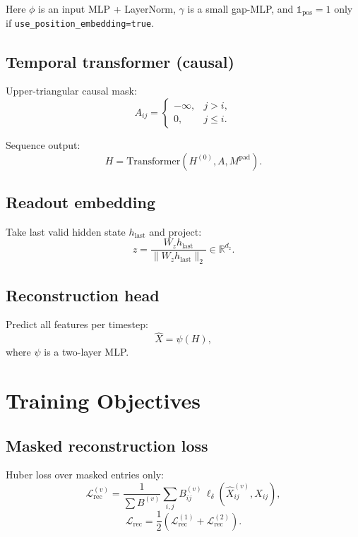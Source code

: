 \documentclass[11pt]{article}
\begin{document}
Here $\phi$ is an input MLP + LayerNorm, $\gamma$ is a small gap-MLP, and $\mathbb{1}_{\text{pos}}=1$ only if \texttt{use\_position\_embedding=true}.

\subsection{Temporal transformer (causal)}
Upper-triangular causal mask:
\begin{equation}
A_{ij}=
\begin{cases}
-\infty,&j>i,\\
0,&j\le i.
\end{cases}
\end{equation}

Sequence output:
\begin{equation}
 H = \text{Transformer}(H^{(0)}, A, M^{\text{pad}}).
\end{equation}

\subsection{Readout embedding}
Take last valid hidden state $h_{\text{last}}$ and project:
\begin{equation}
 z = \frac{W_z h_{\text{last}}}{\|W_z h_{\text{last}}\|_2} \in \mathbb{R}^{d_z}.
\end{equation}

\subsection{Reconstruction head}
Predict all features per timestep:
\begin{equation}
 \hat X = \psi(H),
\end{equation}
where $\psi$ is a two-layer MLP.

\section{Training Objectives}

\subsection{Masked reconstruction loss}
Huber loss over masked entries only:
\begin{equation}
\mathcal{L}_{\text{rec}}^{(v)}=
\frac{1}{\sum B^{(v)}}
\sum_{i,j} B_{ij}^{(v)}\,\ell_\delta\!\left(\hat X_{ij}^{(v)},X_{ij}\right),
\end{equation}
\begin{equation}
\mathcal{L}_{\text{rec}} = \frac{1}{2}\left(\mathcal{L}_{\text{rec}}^{(1)}+\mathcal{L}_{\text{rec}}^{(2)}\right).
\end{equation}
\end{document}
